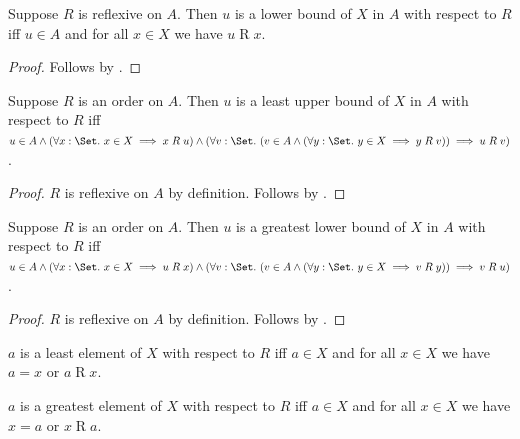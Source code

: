 \begin{proposition}\label{lower_bound_iff_reflexive_on}
    Suppose $R$ is reflexive on $A$.
    Then $u$ is a lower bound of $X$ in $A$ with respect to $R$ iff
        $u\in A$ and for all $x\in X$ we have $u\mathrel{R}x$.
\end{proposition}
\begin{proof}
    Follows by .
\end{proof}

\begin{proposition}\label{least_upper_bound_iff_order_on}
    Suppose $R$ is an order on $A$.
    Then $u$ is a least upper bound of $X$ in $A$ with respect to $R$ iff
        $u\in A\land
        (\forall x:\Set.\ x\in X\implies x\mathrel{R}u)\land
        (\forall v:\Set.\ (v\in A\land
                (\forall y:\Set.\ y\in X\implies y\mathrel{R}v))
            \implies u\mathrel{R}v)$.
\end{proposition}
\begin{proof}
    $R$ is reflexive on $A$ by definition.
    Follows by
        .
\end{proof}

\begin{proposition}\label{greatest_lower_bound_iff_order_on}
    Suppose $R$ is an order on $A$.
    Then $u$ is a greatest lower bound of $X$ in $A$ with respect to $R$ iff
        $u\in A\land
        (\forall x:\Set.\ x\in X\implies u\mathrel{R}x)\land
        (\forall v:\Set.\ (v\in A\land
                (\forall y:\Set.\ y\in X\implies v\mathrel{R}y))
            \implies v\mathrel{R}u)$.
\end{proposition}
\begin{proof}
    $R$ is reflexive on $A$ by definition.
    Follows by
        .
\end{proof}

\begin{definition}\label{least_element}
    $a$ is a least element of $X$ with respect to $R$ iff
        $a\in X$ and for all $x\in X$ we have $a=x$ or $a\mathrel{R}x$.
\end{definition}

\begin{definition}\label{greatest_element}
    $a$ is a greatest element of $X$ with respect to $R$ iff
        $a\in X$ and for all $x\in X$ we have $x=a$ or $x\mathrel{R}a$.
\end{definition}

